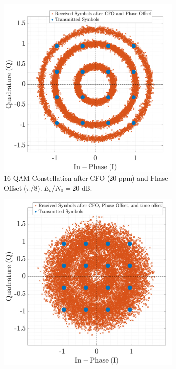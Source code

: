 \documentclass[11pt]{article}
\begin{document}
	\begin{figure}[H]
		\centering
		\begin{subfigure}[b]{0.48\textwidth}
			\centering
			\includegraphics[width=\linewidth]{Images/cfo-po}
			\caption{16-QAM Constellation after CFO (20 ppm) and Phase Offset ($\pi/8$). $E_b/N_0 = 20$ dB.}
			\label{fig:cfo-po-sub}
		\end{subfigure}
		\hfill  
		\begin{subfigure}[b]{0.48\textwidth}
			\centering
			\includegraphics[width=\linewidth]{Images/cfo-po-to}

\end{subfigure}
\end{figure}
\end{document}
